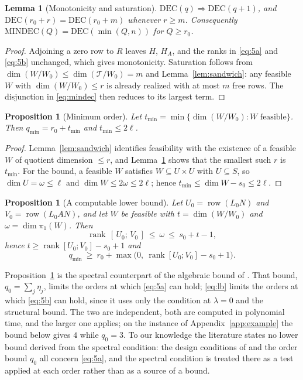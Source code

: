 \documentclass[journal]{IEEEtran}
\theoremstyle{plainn}
\newtheorem{lem}[thm]{Lemma}
\newtheorem{prop}[thm]{Proposition}
\theoremstyle{remark}
\begin{document}
\begin{lem}[Monotonicity and saturation]\label{lem:monotone}
$\mathrm{DEC}(q)\Rightarrow\mathrm{DEC}(q+1)$, and $\mathrm{DEC}(r_0+r)=\mathrm{DEC}(r_0+m)$
whenever $r\ge m$. Consequently $\mathrm{MINDEC}(Q)=\mathrm{DEC}(\min(Q,n))$ for
$Q\ge r_0$.
\end{lem}

\begin{proof}
Adjoining a zero row to $R$ leaves $H$, $H_A$, and the ranks in \eqref{eq:5a} and
\eqref{eq:5b} unchanged, which gives monotonicity. Saturation follows from
$\dim(W/W_0)\le\dim(\mathcal T/W_0)=m$ and Lemma~\ref{lem:sandwich}: any feasible $W$ with
$\dim(W/W_0)\le r$ is already realized with at most $m$ free rows. The disjunction in
\eqref{eq:mindec} then reduces to its largest term.
\end{proof}

\begin{prop}[Minimum order]\label{prop:minorder}
Let $t_{\min}=\min\{\dim(W/W_0):W \text{ feasible}\}$. Then
$q_{\min}=r_0+t_{\min}$ and $t_{\min}\le2\ell$.
\end{prop}

\begin{proof}
Lemma~\ref{lem:sandwich} identifies feasibility with the existence of a feasible $W$ of
quotient dimension $\le r$, and Lemma~\ref{lem:monotone} shows that the smallest such $r$ is
$t_{\min}$. For the bound, a feasible $W$ satisfies $W\subseteq U\times U$ with
$U\subseteq S$, so $\dim U=\omega\le\ell$ and $\dim W\le2\omega\le2\ell$; hence
$t_{\min}\le\dim W-s_0\le2\ell$.
\end{proof}

\begin{prop}[A computable lower bound]\label{prop:lowerbound}
Let $U_0=\operatorname{row}(L_0N)$ and $V_0=\operatorname{row}(L_0AN)$, and let $W$ be feasible with
$t=\dim(W/W_0)$ and $\omega=\dim\pi_1(W)$. Then
\begin{equation}\label{eq:lb}
\operatorname{rank}\,[\,U_0;\,V_0\,]\ \le\ \omega\ \le\ s_0+t-1,
\end{equation}
hence $t\ge\operatorname{rank}[U_0;V_0]-s_0+1$ and
\begin{equation}\label{eq:qmin-lb}
q_{\min}\ \ge\ r_0+\max\bigl(0,\ \operatorname{rank}[U_0;V_0]-s_0+1\bigr).
\end{equation}
\end{prop}

Proposition~\ref{prop:lowerbound} is the spectral counterpart of the algebraic bound of
\cite{fer26a,fer26b}. That bound, $q_0=\sum_j\eta_j$, limits the orders at which \eqref{eq:5a} can
hold; \eqref{eq:lb} limits the orders at which \eqref{eq:5b} can hold, since it uses only the
condition at $\lambda=0$ and the structural bound. The two are independent, both are computed in
polynomial time, and the larger one applies; on the instance of Appendix~\ref{app:example} the bound
below gives $4$ while $q_0=3$. To our knowledge the literature states no lower bound derived from the
spectral condition: the design conditions of \cite{fer10,dar25,fer26a,fer26b} and the order bound
$q_0$ all concern \eqref{eq:5a}, and the spectral condition is treated there as a test applied at each
order rather than as a source of a bound.
\end{document}
